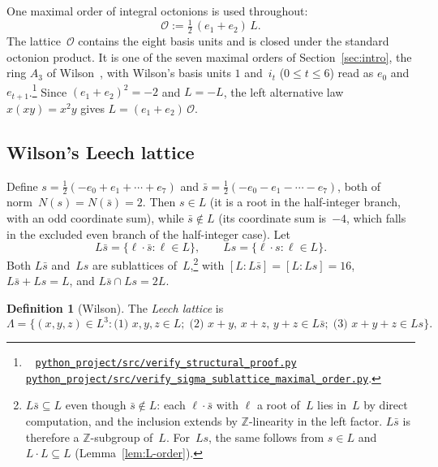 \documentclass[twoside,english]{paper}
\numberwithin{equation}{section}
\numberwithin{figure}{section}
\theoremstyle{definition}
\newtheorem{definition}[theorem]{Definition}
\theoremstyle{remark}
\newcommand{\MO}{\mathcal{O}}         %
\newcommand{\ZZ}{\mathbb{Z}}
\newcommand{\LL}{\Lambda}             %
\newcommand{\Nrm}{N}                  %
\newcommand{\scriptref}[1]{\cite{repo}~%
  \href{https://github.com/koeplinger/leech\_alg/blob/main/python\_project/src/#1}%
  {\nolinkurl{python_project/src/#1}}}
\begin{document}
One maximal order of integral octonions is used throughout:
\begin{equation}\label{eq:MO}
  \MO := \tfrac12\,(e_1 + e_2)\,L .
\end{equation}
The lattice~$\MO$ contains the eight basis units and is closed under
the standard octonion product.  It is one of the seven maximal orders
of Section~\ref{sec:intro}, the ring $A_3$ of
Wilson~\cite[Section~2]{Wilson2009}, with Wilson's basis units $1$
and~$i_t$ ($0 \le t \le 6$) read as $e_0$ and~$e_{t+1}$.\footnote{\scriptref{verify\_structural\_proof.py}
\scriptref{verify\_sigma\_sublattice\_maximal\_order.py}.}  Since
$(e_1 + e_2)^2 = -2$ and $L = -L$, the left alternative law
$x(xy) = x^2 y$ gives $L = (e_1 + e_2)\,\MO$.

\subsection{Wilson's Leech lattice}\label{subsec:wilson-leech}

Define $s = \tfrac{1}{2}(-e_0 + e_1 + \cdots + e_7)$ and
$\bar{s} = \tfrac{1}{2}(-e_0 - e_1 - \cdots - e_7)$, both of
norm~$\Nrm(s) = \Nrm(\bar{s}) = 2$.  Then $s \in L$ (it is a
root in the half-integer branch, with an odd coordinate sum), while $\bar{s} \notin L$
(its coordinate sum is~$-4$, which falls in the excluded even
branch of the half-integer case).  Let
\begin{equation}\label{eq:disp1}
  L\bar{s} = \{ \ell \cdot \bar{s} : \ell \in L \}, \qquad
  Ls = \{ \ell \cdot s : \ell \in L \}.
\end{equation}
Both $L\bar{s}$ and~$Ls$ are sublattices of~$L$,\footnote{$L\bar
s \subseteq L$ even though $\bar s \notin L$: each $\ell \cdot
\bar s$ with $\ell$ a root of~$L$ lies in~$L$ by direct
computation, and the inclusion extends by $\ZZ$-linearity in the
left factor.  $L\bar s$ is therefore a $\ZZ$-subgroup of~$L$.
For~$Ls$, the same follows from $s \in L$ and
$L \cdot L \subseteq L$ (Lemma~\ref{lem:L-order}).}
with
$[L : L\bar{s}] = [L : Ls] = 16$,
$L\bar{s} + Ls = L$, and $L\bar{s} \cap Ls = 2L$.

\begin{definition}[Wilson]\label{def:wilson-leech}
The \emph{Leech lattice} is
\begin{equation}\label{eq:disp2}
  \LL = \bigl\{ (x,y,z) \in L^3 :
    \text{(1) } x,y,z \in L;\;
    \text{(2) } x{+}y,\, x{+}z,\, y{+}z \in L\bar{s};\;
    \text{(3) } x{+}y{+}z \in Ls
  \bigr\}.
\end{equation}
\end{definition}
\end{document}
